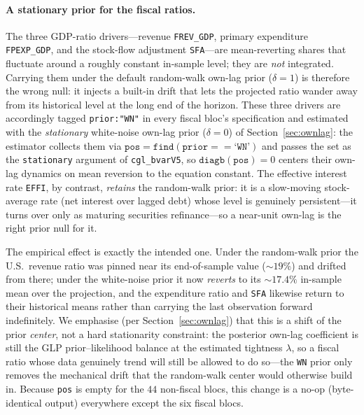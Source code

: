 \documentclass[11pt]{article}
\theoremstyle{definition}
\theoremstyle{remark}
\begin{document}
\paragraph{A stationary prior for the fiscal ratios.} The three
GDP-ratio drivers---revenue \texttt{FREV\_GDP}, primary expenditure
\texttt{FPEXP\_GDP}, and the stock-flow adjustment \texttt{SFA}---are
mean-reverting shares that fluctuate around a roughly constant
in-sample level; they are \emph{not} integrated. Carrying them under the
default random-walk own-lag prior ($\delta=1$) is therefore the wrong
null: it injects a built-in drift that lets the projected ratio wander
away from its historical level at the long end of the horizon. These
three drivers are accordingly tagged \texttt{prior:"WN"} in every fiscal
bloc's specification and estimated with the \emph{stationary}
white-noise own-lag prior ($\delta=0$) of Section~\ref{sec:ownlag}: the
estimator collects them via \(\texttt{pos}=\texttt{find}(\texttt{prior}==
\text{`}\texttt{WN}\text{'})\) and passes the set as the
\texttt{stationary} argument of \texttt{cgl\_bvarV5}, so
\(\texttt{diagb}(\texttt{pos})=0\) centers their own-lag dynamics on
mean reversion to the equation constant. The effective interest rate
\texttt{EFFI}, by contrast, \emph{retains} the random-walk prior: it is a
slow-moving stock-average rate (net interest over lagged debt) whose
level is genuinely persistent---it turns over only as maturing securities
refinance---so a near-unit own-lag is the right prior null for it.

The empirical effect is exactly the intended one. Under the random-walk
prior the U.S.\ revenue ratio was pinned near its end-of-sample value
($\sim 19\%$) and drifted from there; under the white-noise prior it now
\emph{reverts} to its $\sim 17.4\%$ in-sample mean over the projection,
and the expenditure ratio and \texttt{SFA} likewise return to their
historical means rather than carrying the last observation forward
indefinitely. We emphasise (per Section~\ref{sec:ownlag}) that this is a
shift of the prior \emph{center}, not a hard stationarity constraint: the
posterior own-lag coefficient is still the GLP prior--likelihood balance
at the estimated tightness $\lambda$, so a fiscal ratio whose data
genuinely trend will still be allowed to do so---the \texttt{WN} prior
only removes the mechanical drift that the random-walk center would
otherwise build in. Because \texttt{pos} is empty for the $44$ non-fiscal
blocs, this change is a no-op (byte-identical output) everywhere except
the six fiscal blocs.
\end{document}
